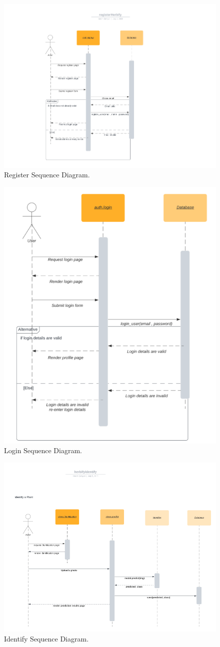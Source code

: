 \documentclass[conference]{IEEEtran}
\begin{document}
\begin{figure}[H]
\centerline{\includegraphics[width=0.48 \textwidth]{images/umlRegister.png}}
\caption{Register Sequence Diagram.}
\label{fig:graph5}
\end{figure}


\begin{figure}[H]
\centerline{\includegraphics[width=0.48 \textwidth]{images/umlLogin.png}}
\caption{Login Sequence Diagram.}
\label{fig:graph5}
\end{figure}


\begin{figure}[H]
\centerline{\includegraphics[width=0.48 \textwidth]{images/umlIdentify.png}}
\caption{Identify Sequence Diagram.}
\label{fig:graph5}
\end{figure}
\end{document}
